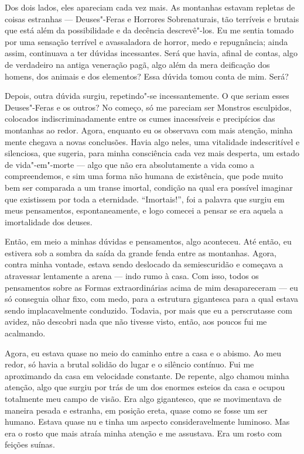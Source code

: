 Dos dois lados, eles apareciam cada vez mais. As montanhas estavam repletas de coisas estranhas --- Deuses"-Feras e
Horrores Sobrenaturais, tão terríveis e brutais que está além da possibilidade e da decência descrevê"-los. Eu me
sentia tomado por uma sensação terrível e avassaladora de horror, medo e repugnância; ainda assim, continuava a ter
dúvidas incessantes. Será que havia, afinal de contas, algo de verdadeiro na antiga veneração pagã, algo além da mera
deificação dos homens, dos animais e dos elementos? Essa dúvida tomou conta de mim. Será?

Depois, outra dúvida surgiu, repetindo"-se incessantemente. O que seriam esses Deuses"-Feras e os outros? No começo, só
me pareciam ser Monstros esculpidos, colocados indiscriminadamente entre os cumes inacessíveis e precipícios das
montanhas ao redor. Agora, enquanto eu os observava com mais atenção, minha mente chegava a novas conclusões. Havia
algo neles, uma vitalidade indescritível e silenciosa, que sugeria, para minha consciência cada vez mais desperta, um
estado de vida"-em"-morte --- algo que não era absolutamente a vida como a compreendemos, e sim uma forma não humana de
existência, que pode muito bem ser comparada a um transe imortal, condição na qual era possível imaginar que existissem
por toda a eternidade. ``Imortais!'', foi a palavra que surgiu em meus pensamentos, espontaneamente, e logo comecei a
pensar se era aquela a imortalidade dos deuses.

Então, em meio a minhas dúvidas e pensamentos, algo aconteceu. Até então, eu estivera sob a sombra da saída da grande
fenda entre as montanhas. Agora, contra minha vontade, estava sendo deslocado da semiescuridão e começava a atravessar
lentamente a arena --- indo rumo à casa. Com isso, todos os pensamentos sobre as Formas extraordinárias acima de mim
desapareceram --- eu só conseguia olhar fixo, com medo, para a estrutura gigantesca para a qual estava sendo
implacavelmente conduzido. Todavia, por mais que eu a perscrutasse com avidez, não descobri nada que não tivesse
visto, então, aos poucos fui me acalmando.

Agora, eu estava quase no meio do caminho entre a casa e o abismo. Ao meu redor, só havia a brutal solidão do lugar e o
silêncio contínuo. Fui me aproximando da casa em velocidade constante. De repente, algo chamou minha atenção,
algo que surgiu por trás de um dos enormes esteios da casa e ocupou totalmente meu campo de visão. Era algo gigantesco,
que se movimentava de maneira pesada e estranha, em posição ereta, quase como se fosse um ser humano. Estava quase nu e
tinha um aspecto consideravelmente luminoso. Mas era o rosto que mais atraía minha atenção e me assustava. Era um rosto
com feições suínas.

